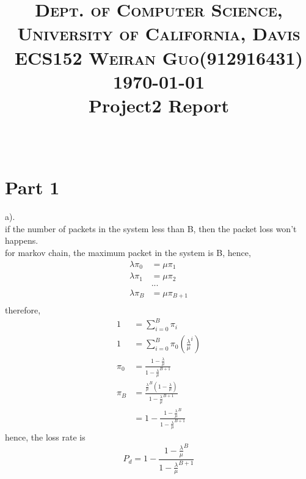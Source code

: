 \documentclass[paper=a4, fontsize=11pt]{scrartcl}
\title{	
\normalfont \normalsize 
\textsc{Dept. of Computer Science, University of California, Davis\\ECS152 \hspace{.5in}
Weiran Guo(912916431) \hspace{.5in} \today}
\horrule{0.5pt} \\[0.4cm]
\huge Project2 Report \\
\horrule{2pt} \\[0.5cm]
}
\date{}
\DeclarePairedDelimiter\floor{\lfloor}{\rfloor}
\numberwithin{equation}{section} %
\numberwithin{figure}{section} %
\numberwithin{table}{section} %
\begin{document}
\maketitle

\vspace{-1in}


\section{Part 1}

       a).\\
       if the number of packets in the system less than B, %
       then the packet loss won't happens.\\
       
        for markov chain, the maximum packet in the system is B, hence,
        \begin{align}
            \lambda\pi_0 &= \mu\pi_1\\
            \lambda\pi_1 &= \mu\pi_2\\
                &...\\
            \lambda\pi_{B} &= \mu\pi_{B+1}\\
        \end{align}
        therefore,
        \begin{align}
            1 &= \sum_{i = 0}^{B} \pi_i\\
            1 &= \sum_{i = 0}^{B} \pi_0(\frac{\lambda}{\mu}^i)\\
            \pi_0 &= \frac{1-\frac{\lambda}{\mu}}{1-\frac{\lambda}{\mu}^{B+1}}\\
            \pi_{B} &= \frac{\frac{\lambda}{\mu}^B(1-\frac{\lambda}{\mu})}{1-\frac{\lambda}{\mu}^{B+1}}\\
                &= 1 - \frac{1 - \frac{\lambda}{\mu}^B}{1-\frac{\lambda}{\mu}^{B+1}}
        \end{align}
        hence, the loss rate is
        \begin{equation}
            P_d = 1 - \frac{1 - \frac{\lambda}{\mu}^B}{1-\frac{\lambda}{\mu}^{B+1}}
        \end{equation}
\end{document}
